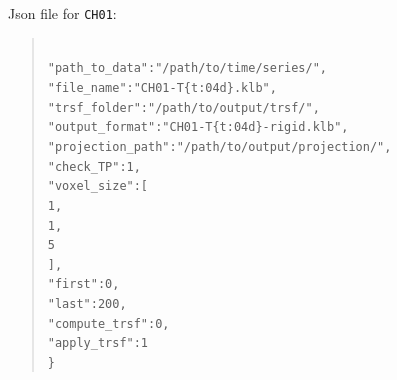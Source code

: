 \documentclass[10pt,a4paper]{article}
\newcommand\tab[1][.6cm]{\hspace*{#1}}
\newenvironment{code}[1]{\mbox{}\\[1ex]\hspace*{-#1cm}\begin{minipage}{150mm}\begin{quote}\tt}{\end{quote}\end{minipage}\mbox{}\\[1ex]}
\begin{document}
Json file for \texttt{CH01}:
\begin{code}{0.8}
\{\\
\tab"path\_to\_data":"/path/to/time/series/",\\
\tab"file\_name":"CH01-T\{t:04d\}.klb",\\
\tab"trsf\_folder":"/path/to/output/trsf/",\\
\tab"output\_format":"CH01-T\{t:04d\}-rigid.klb",\\
\tab"projection\_path":"/path/to/output/projection/",\\
\tab"check\_TP":1,\\
\tab"voxel\_size":[\\
\tab\tab1,\\
\tab\tab1,\\
\tab\tab5\\
\tab],\\
\tab"first":0,\\
\tab"last":200,\\
\tab"compute\_trsf":0,\\
\tab"apply\_trsf":1\\
\}
\end{code}


\end{document}
